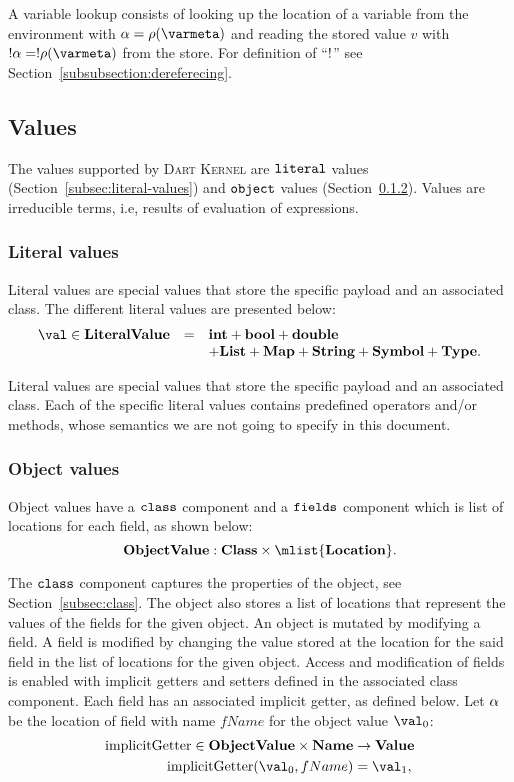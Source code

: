 \documentclass[a4paper,oneside]{article}
\newcommand{\kernel}{\textsc{Dart Kernel}}
\DeclareMathOperator{\getter}{implicitGetter}
\begin{document}
A variable lookup consists of looking up the location of a variable from the environment with $\loc = \env(\varmeta)$ and reading the stored value $v$ with $\deref{\loc} = \deref{\env(\varmeta)}$ from the store.
For definition of ``$\deref$'' see Section~\ref{subsubsection:dereferecing}.


\subsection{Values}
\label{sec:values}

The values supported by \kernel{} are $\tt{literal}$ values (Section~\ref{subsec:literal-values}) and $\tt{object}$ values (Section~\ref{subsec:object-values}).
Values are irreducible terms, i.e, results of evaluation of expressions.


\subsubsection{Literal values}
\label{subsubsec:literal-values}

Literal values are special values that store the specific payload and an associated class.
The different literal values are presented below:
\[
  \begin{array}{lcl}
    \val \in \dlitval &=& \mathbf{int} + \mathbf{bool} + \mathbf{double}\\
    && + \mathbf{List} + \mathbf{Map} + \mathbf{String} + \mathbf{Symbol} + \mathbf{Type}.
  \end{array}
\]

Literal values are special values that store the specific payload and an associated class.
Each of the specific literal values contains predefined operators and/or methods, whose semantics we are not going to specify in this document.


\subsubsection{Object values}
\label{subsec:object-values}

Object values have a $\tt{class}$ component and a $\tt{fields}$ component which is list of locations for each field, as shown below:
\[
    \dobjval : \dclass \times \mlist{\dlocation}.
\]

The $\tt{class}$ component captures the properties of the object, see Section~\eqref{subsec:class}.
The object also stores a list of locations that represent the values of the fields for the given object.
An object is mutated by modifying a field.
A field is modified by changing the value stored at the location for the said field in the list of locations for the given object.
Access and modification of fields is enabled with implicit getters and setters defined in the associated class component.
Each field has an associated implicit getter, as defined below.
Let $\alpha$ be the location of field with name $fName$ for the object value $\val_0$:
\begin{align*}
  \getter \in \dobjval \times \mathbf{Name} &\rightarrow \dval\\
  \getter(\val_0, fName) &= \val_1,
\end{align*}
\end{document}
